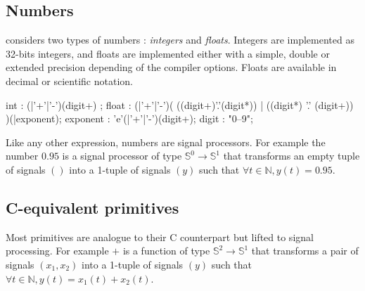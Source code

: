 \documentclass[a4paper,10pt]{book}
\begin{document}
\subsection{Numbers}

\faust considers two types of numbers : \textit{integers} and \textit{floats}. Integers are implemented as 32-bits integers, and floats are implemented either with a simple, double or extended precision depending of the compiler options. Floats are available in decimal or scientific notation. 

  \begin{rail}
  int : (|'+'|'-')(digit+) ;
  float : (|'+'|'-')( ((digit+)'.'(digit*)) | ((digit*) '.' (digit+)) )(|exponent);
  exponent : 'e'(|'+'|'-')(digit+);
  digit : "0--9";
  \end{rail}


\bigskip

Like any other \faust expression, numbers are signal processors. For example the number $0.95$ is a signal processor of type $\mathbb{S}^{0}\rightarrow\mathbb{S}^{1}$ that transforms an empty tuple of signals $()$ into a 1-tuple of signals $(y)$ such that $\forall t\in\mathbb{N}, y(t)=0.95$.



\subsection{C-equivalent primitives}

Most \faust primitives are analogue to their C counterpart but lifted to signal processing.
For example $+$ is a function of type $\mathbb{S}^{2}\rightarrow\mathbb{S}^{1}$ that transforms a pair of signals $(x_1,x_2)$ into a 1-tuple of signals $(y)$ such that $\forall t\in\mathbb{N}, y(t)=x_{1}(t)+x_{2}(t)$.
\end{document}

